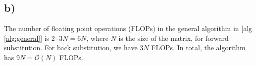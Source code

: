 \documentclass[11pt]{article} %
\begin{document}
\subsection*{b)}
The number of floating point operations (FLOPs) in the general algorithm in [alg \ref{alg:general}] is $2 \cdot 3 N = 6N$, where $N$ is the size of the matrix, for forward substitution. For back substitution, we have $3 N$ FLOPs. In total, the algorithm has $9N = \mathcal{O}(N)$ FLOPs. 
\end{document}
